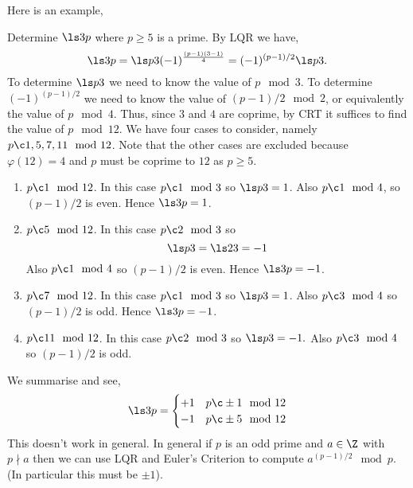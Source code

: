 Here is an example,
\begin{eg}
  Determine $\ls 3 p$ where $p \ge 5$ is a prime. By LQR we have,
  $$ \ls 3 p = \ls p 3 (-1)^{\frac{(p-1)(3 - 1)}{4}} = (-1)^{(p-1)/2}\ls p 3. $$
  To determine $\ls p 3$ we need to know the value of $p \mod 3$. To determine $(-1)^{(p-1)/2}$ we need to know the value of $(p-1)/2 \mod 2$, or equivalently the value of $p \mod 4$. Thus, since $3$ and $4$ are coprime, by CRT it suffices to find the value of $p \mod 12$. We have four cases to consider, namely $p \c 1, 5, 7, 11 \mod 12$. Note that the other cases are excluded because $\varphi(12) = 4$ and $p$ must be coprime to $12$ as $p \ge 5$.\\

  \noindent
  \begin{enumerate}
    \item $p \c 1 \mod 12$. In this case $p \c 1 \mod 3$ so $\ls p 3 = 1$. Also $p \c 1 \mod 4$, so $(p-1)/2$ is even. Hence $\ls 3 p = 1$.
    \item $p \c 5 \mod 12$. In this case $p \c 2 \mod 3$ so
    $$ \ls p 3 = \ls 2 3 = -1 $$
    Also $p \c 1 \mod 4$ so $(p-1)/2$ is even. Hence $\ls 3 p = -1$.
    \item $p \c 7 \mod 12$. In this case $p \c 1 \mod 3$ so $\ls p 3 = 1$. Also $p \c 3 \mod 4$ so $(p-1)/2$ is odd. Hence $\ls 3 p = -1$.
    \item $p \c 11 \mod 12$. In this case $p \c 2 \mod 3$ so $\ls p 3 = -1.$ Also $p \c 3 \mod 4$ so $(p-1)/2$ is odd.
  \end{enumerate}
  We summarise and see,
  $$ \ls 3 p = \begin{cases}
    +1 & p \c \pm 1 \mod 12 \\
    -1 & p \c \pm 5 \mod 12
  \end{cases} $$
  This doesn't work in general. In general if $p$ is an odd prime and $a \in \Z$ with $p \nmid a$ then we can use LQR and Euler's Criterion to compute $a^{(p-1)/2}\mod p$. (In particular this must be $\pm 1$).
\end{eg}

